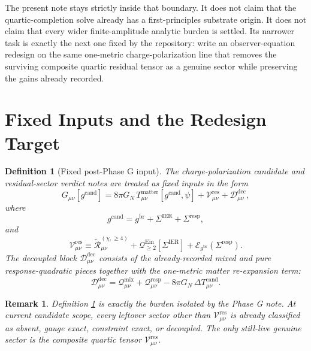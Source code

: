 \documentclass[11pt]{article}
\newcommand{\ObserverMetric}{g^{\mathrm{br}}}
\newcommand{\CandidateMetric}{g^{\mathrm{cand}}}
\newcommand{\BaseShift}{\Sigma^{\mathrm{IER}}}
\newcommand{\ResponseShift}{\Sigma^{\mathrm{resp}}}
\newcommand{\ReLongFour}{\widetilde{\mathcal R}_{\mu\nu}^{(\chi,\ge 4)}}
\newcommand{\DeltaTCand}{\Delta T_{\mu\nu}^{\mathrm{cand}}}
\newcommand{\EinLin}{\mathcal E_{\ObserverMetric}}
\newcommand{\EinQuad}{\mathcal Q_{\ge 2}^{\mathrm{Ein}}}
\newcommand{\ResidualCore}{\mathcal V_{\mu\nu}^{\mathrm{res}}}
\newcommand{\ResidualDec}{\mathcal D_{\mu\nu}^{\mathrm{dec}}}
\newtheorem{definition}{Definition}
\newtheorem{remark}{Remark}
\begin{document}
The present note stays strictly inside that boundary. It does not claim that the quartic-completion solve already has a first-principles substrate origin. It does not claim that every wider finite-amplitude analytic burden is settled. Its narrower task is exactly the next one fixed by the repository: write an observer-equation redesign on the same one-metric charge-polarization line that removes the surviving composite quartic residual tensor as a genuine sector while preserving the gains already recorded.

\section{Fixed Inputs and the Redesign Target}

\begin{definition}[Fixed post-Phase G input]
\label{def:input}
The charge-polarization candidate and residual-sector verdict notes are treated as fixed inputs in the form
\begin{equation}
G_{\mu\nu}[\CandidateMetric]
=
8\pi G_N\,T_{\mu\nu}^{\mathrm{matter}}[\CandidateMetric,\psi]
+\ResidualCore+\ResidualDec,
\label{eq:candobs}
\end{equation}
where
\begin{equation}
\CandidateMetric
=
\ObserverMetric+\BaseShift+\ResponseShift,
\label{eq:gcand}
\end{equation}
and
\begin{equation}
\ResidualCore
\equiv
\ReLongFour
+\EinQuad[\BaseShift]
+\EinLin(\ResponseShift).
\label{eq:vres}
\end{equation}
The decoupled block \(\ResidualDec\) consists of the already-recorded mixed and pure response-quadratic pieces together with the one-metric matter re-expansion term:
\begin{equation}
\ResidualDec
=
\mathcal Q_{\mu\nu}^{\mathrm{mix}}
+\mathcal Q_{\mu\nu}^{\mathrm{resp}}
-8\pi G_N\,\DeltaTCand.
\label{eq:ddec}
\end{equation}
\end{definition}

\begin{remark}
Definition \ref{def:input} is exactly the burden isolated by the Phase G note. At current candidate scope, every leftover sector other than \(\ResidualCore\) is already classified as absent, gauge exact, constraint exact, or decoupled. The only still-live genuine sector is the composite quartic tensor \(\ResidualCore\).
\end{remark}
\end{document}
